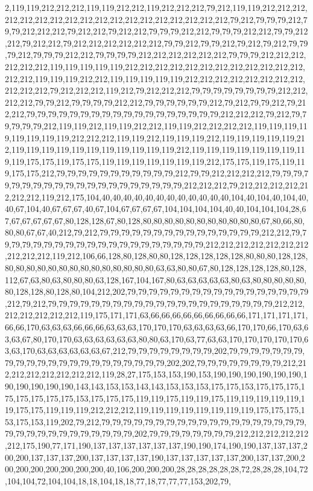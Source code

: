 2,119,119,212,212,212,119,119,212,212,119,212,212,212,79,212,119,119,212,212,212,212,212,212,212,212,212,212,212,212,212,212,212,212,212,212,79,212,79,79,79,212,79,79,212,212,212,79,212,212,79,212,212,79,79,79,212,212,79,79,79,212,212,79,79,212,212,79,212,212,79,212,212,212,212,212,212,79,79,212,79,79,212,79,212,79,212,79,79,79,212,79,79,79,212,212,79,79,79,79,212,212,212,212,212,212,79,79,79,212,212,212,212,212,212,119,119,119,119,119,212,212,212,212,212,212,212,212,212,212,212,212,212,212,119,119,119,212,212,119,119,119,119,119,212,212,212,212,212,212,212,212,212,212,212,79,212,212,212,119,212,79,212,212,212,79,79,79,79,79,79,79,79,212,212,212,212,79,79,212,79,79,79,79,212,212,79,79,79,79,79,79,212,79,212,79,79,212,79,212,212,79,79,79,79,79,79,79,79,79,79,79,79,79,79,79,79,79,79,212,212,212,79,212,79,79,79,79,79,212,119,119,212,119,119,212,212,119,119,212,212,212,212,119,119,119,119,119,119,119,119,212,212,212,119,119,212,119,119,119,212,119,119,119,119,119,212,119,119,119,119,119,119,119,119,119,119,119,212,119,119,119,119,119,119,119,119,119,175,175,119,175,175,119,119,119,119,119,119,119,212,175,175,119,175,119,119,175,175,212,79,79,79,79,79,79,79,79,79,79,79,212,79,79,212,212,212,212,79,79,79,79,79,79,79,79,79,79,79,79,79,79,79,79,79,79,79,79,212,212,212,79,212,212,212,212,212,212,212,119,212,175,104,40,40,40,40,40,40,40,40,40,40,40,40,104,40,104,40,104,40,40,67,104,40,67,67,67,40,67,104,67,67,67,67,104,104,104,104,40,40,104,104,104,28,67,67,67,67,67,67,80,128,128,67,80,128,80,80,80,80,80,80,80,80,80,80,80,67,80,66,80,80,80,67,67,40,212,79,212,79,79,79,79,79,79,79,79,79,79,79,79,79,79,79,212,212,79,79,79,79,79,79,79,79,79,79,79,79,79,79,79,79,79,79,79,79,212,212,212,212,212,212,212,212,212,212,119,212,106,66,128,80,128,80,80,128,128,128,128,128,80,80,80,128,128,80,80,80,80,80,80,80,80,80,80,80,80,80,80,63,63,80,80,67,80,128,128,128,128,80,128,112,67,63,80,63,80,80,80,63,128,167,104,167,80,63,63,63,63,63,80,63,80,80,80,80,80,80,128,128,80,128,80,104,212,202,79,79,79,79,79,79,79,79,79,79,79,79,79,79,79,79,79,212,79,212,79,79,79,79,79,79,79,79,79,79,79,79,79,79,79,79,79,79,79,79,79,212,212,212,212,212,212,212,119,175,171,171,63,66,66,66,66,66,66,66,66,66,171,171,171,171,66,66,170,63,63,63,66,66,66,63,63,63,170,170,170,63,63,63,63,66,170,170,66,170,63,63,63,67,80,170,170,63,63,63,63,63,63,80,80,63,170,63,77,63,63,170,170,170,170,170,63,63,170,63,63,63,63,63,63,67,212,79,79,79,79,79,79,79,79,202,79,79,79,79,79,79,79,79,79,79,79,79,79,79,79,79,79,79,79,79,79,79,202,202,79,79,79,79,79,79,79,79,212,212,212,212,212,212,212,212,119,28,27,175,153,153,190,153,190,190,190,190,190,190,190,190,190,190,190,143,143,153,153,143,143,153,153,153,175,175,153,175,175,175,175,175,175,175,175,153,175,175,175,119,119,175,119,119,175,119,119,119,119,119,119,175,175,119,119,119,212,212,212,119,119,119,119,119,119,119,119,175,175,175,153,175,153,119,202,79,212,79,79,79,79,79,79,79,79,79,79,79,79,79,79,79,79,79,79,79,79,79,79,79,79,79,79,79,79,79,79,79,202,79,79,79,79,79,79,79,79,212,212,212,212,212,212,175,190,77,171,190,137,137,137,137,137,137,190,190,174,190,190,137,137,137,200,200,137,137,137,200,137,137,137,137,190,137,137,137,137,137,200,137,137,200,200,200,200,200,200,200,200,40,106,200,200,200,28,28,28,28,28,28,72,28,28,28,104,72,104,104,72,104,104,18,18,104,18,18,77,18,77,77,77,153,202,79,